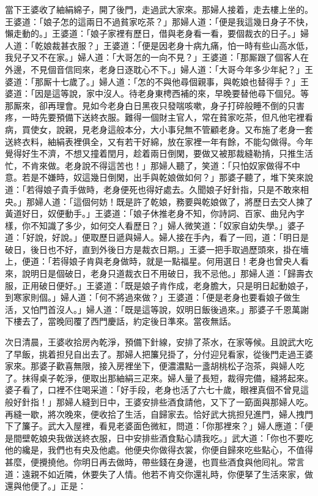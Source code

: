 當下王婆收了紬絹綿子，開了後門，走過武大家來。那婦人接着，走去樓上坐的。王婆道：「娘子怎的這兩日不過貧家吃茶？」那婦人道：「便是我這幾日身子不快，懶走動的。」王婆道：「娘子家裡有歷日，借與老身看一看，要個裁衣的日子。」婦人道：「乾娘裁甚衣服？」王婆道：「便是因老身十病九痛，怕一時有些山高水低，我兒子又不在家。」婦人道：「大哥怎的一向不見？」王婆道：「那厮跟了個客人在外邊，不見個音信囘來，老身日逐耽心不下。」婦人道：「大哥今年多少年紀？」王婆道：「那厮十七歲了。」婦人道：「怎的不與他尋個親事，{}與乾娘也替得手？」王婆道：「因是這等說，家中沒人。待老身東梬西補的來，早晚要替他尋下個兒。等那厮來，卻再理會。見如今老身白日黑夜只發喘咳嗽，身子打碎般睡不倒的只害疼，一時先要預備下送終衣服。難得一個財主官人，常在貧家吃茶，但凡他宅裡看病，買使女，說親，見老身這般本分，大小事兒無不管顧老身。又布施了老身一套送終衣料，{}紬絹表裡俱全，又有若干好綿，放在家裡一年有餘，不能勾做得。今年覺得好生不濟，不想又撞着閏月，趁着兩日倒閑，要做又被那裁縫勒掯，只推生活忙，不肯來做。老身說不得這苦也！」那婦人聽了，笑道：「只怕奴家做得不中意。{}若是不嫌時，奴這幾日倒閑，出手與乾娘做如何？」那婆子聽了，堆下笑來說道：「若得娘子貴手做時，老身便死也得好處去。久聞娘子好針指，只是不敢來相央。」那婦人道：「這個何妨！既是許了乾娘，務要與乾娘做了，將歷日去交人揀了黃道好日，奴便動手。」王婆道：「娘子休推老身不知，你詩詞、百家、曲兒內字樣，你不知識了多少，如何交人看歷日？」婦人微笑道：「奴家自幼失學。」婆子道：「好說，好說。」便取歷日遞與婦人。婦人接在手內，看了一囘，道：「明日是破日，後日也不好，直到外後日方是裁衣日期。」王婆一把手取過歷頭來，掛在墻上，便道：「若得娘子肯與老身做時，就是一點福星。{}何用選日！老身也曾央人看來，說明日是個破日，老身只道裁衣日不用破日，我不忌他。」那婦人道：「歸壽衣服，正用破日便好。」王婆道：「既是娘子肯作成，老身膽大，只是明日起動娘子，到寒家則個。」婦人道：「何不將過來做？」王婆道：「便是老身也要看娘子做生活，又怕門首沒人。」婦人道：「既是這等說，奴明日飯後過來。」那婆子千恩萬謝下樓去了，當晚囘覆了西門慶話，約定後日準來。當夜無話。

次日清晨，王婆收拾房內乾淨，預備下針線，安排了茶水，在家等候。且說武大吃了早飯，挑着担兒自出去了。那婦人把簾兒掛了，分付迎兒看家，從後門走過王婆家來。那婆子歡喜無限，接入房裡坐下，便濃濃點一盞胡桃松子泡茶，與婦人吃了。抹得桌子乾淨，便取出那紬絹三疋來。婦人量了長短，裁得完備，縫將起來。婆子看了，口裡不住喝采道：「好手段，老身也活了六七十歲，眼裡真個不曾見這般好針指！」那婦人縫到日中，王婆安排些酒食請他，又下了一筯面與那婦人吃。再縫一歇，將次晚來，便收拾了生活，自歸家去。恰好武大挑担兒進門，婦人拽門下了簾子。武大入屋裡，看見老婆面色微紅，問道：「你那裡來？」婦人應道：「便是間壁乾娘央我做送終衣服，日中安排些酒食點心請我吃。」武大道：「你也不要吃他的纔是，我們也有央及他處。他便央你做得衣裳，你便自歸來吃些點心，不值得甚麼，便攪撓他。你明日再去做時，帶些錢在身邊，也買些酒食與他囘礼。常言道：遠親不如近隣，休要失了人情。他若不肯交你還礼時，你便拏了生活來家，做還與他便了。」正是：

